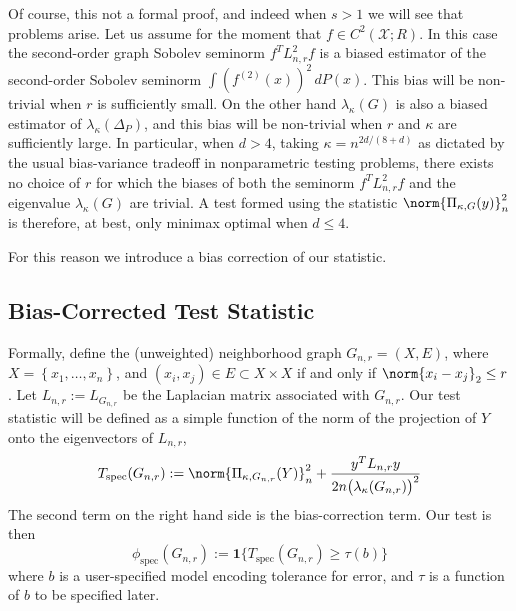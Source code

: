 \documentclass{article}
\newcommand{\set}[1]{\left\{#1\right\}}
\newcommand{\1}{\mathbf{1}}
\newcommand{\spec}{\mathrm{spec}}
\theoremstyle{alden}
\theoremstyle{aldenthm}
\theoremstyle{definition}
\theoremstyle{remark}
\begin{document}
Of course, this not a formal proof, and indeed when $s > 1$ we will see that problems arise. Let us assume for the moment that $f \in C^2(\mathcal{X};R)$.
In this case the second-order graph Sobolev seminorm $f^T L_{n,r}^2f$ is a biased estimator of the second-order Sobolev seminorm $\int (f^{(2)}(x))^2 \,dP(x)$. This bias will be non-trivial when $r$ is sufficiently small. On the other hand $\lambda_{\kappa}(G)$ is also a biased estimator of $\lambda_{\kappa}(\Delta_P)$, and this bias will be non-trivial when $r$ and $\kappa$ are sufficiently large. In particular, when $d > 4$, taking $\kappa = n^{2d/(8 + d)}$ as dictated by the usual bias-variance tradeoff in nonparametric testing problems, there exists no choice of $r$ for which the biases of both the seminorm $f^T L_{n,r}^2f$ and the eigenvalue $\lambda_{\kappa}(G)$ are trivial. A test formed using the statistic $\norm{\Pi_{\kappa,G}(y)}_n^2$ is therefore, at best, only minimax optimal when $d \leq 4$. 

For this reason we introduce a bias correction of our statistic.

\subsection{Bias-Corrected Test Statistic}

Formally, define the (unweighted) neighborhood graph $G_{n,r} = (X,E)$, where $X = \set{x_1,\ldots,x_n}$, and $(x_i,x_j) \in E \subset X \times X$ if and only if $\norm{x_i - x_j}_2 \leq r$. Let $L_{n,r} := L_{G_{n,r}}$ be the Laplacian matrix associated with $G_{n,r}$. Our test statistic will be defined as a simple function of the norm of the projection of $Y$ onto the eigenvectors of $L_{n,r}$,
\begin{equation*}
T_{\spec}(G_{n,r}) := \norm{\Pi_{\kappa,G_{n,r}}(Y)}_n^2 + \frac{y^T L_{n,r} y}{2 n\bigl(\lambda_{\kappa}(G_{n,r})\bigr)^2}
\end{equation*}
The second term on the right hand side is the bias-correction term. Our test is then
\begin{equation*}
\phi_{\spec}(G_{n,r}) := \1\{T_{\spec}(G_{n,r}) \geq \tau(b) \}
\end{equation*}
where $b$ is a user-specified model encoding tolerance for error, and $\tau$ is a function of $b$ to be specified later.
\end{document}
